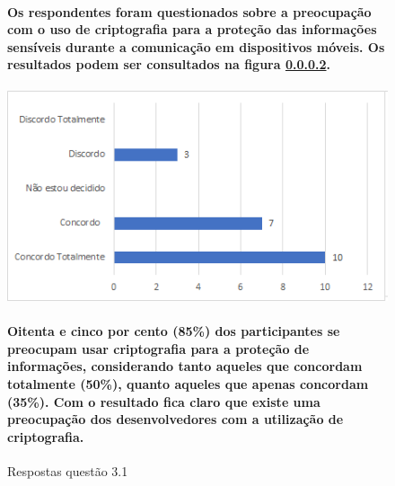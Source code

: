 \begin{figure}[!t]
\centering

\paragraph{Os respondentes foram questionados sobre a preocupação com o uso de criptografia para a proteção das informações sensíveis durante a comunicação em dispositivos móveis.  Os resultados podem ser consultados na figura \ref{fig:3.1}.
}
\includegraphics[scale=0.7]{figuras das questoes/3.1.png}
\caption{Respostas questão 3.1}

\paragraph{Oitenta e cinco por cento (85{\%}) dos participantes se preocupam usar criptografia para a proteção de informações, considerando tanto aqueles que concordam totalmente (50{\%}), quanto aqueles que apenas concordam (35{\%}). Com o resultado fica claro que existe uma preocupação dos desenvolvedores com a utilização de criptografia.
}

\label{fig:3.1}
\end{figure}

